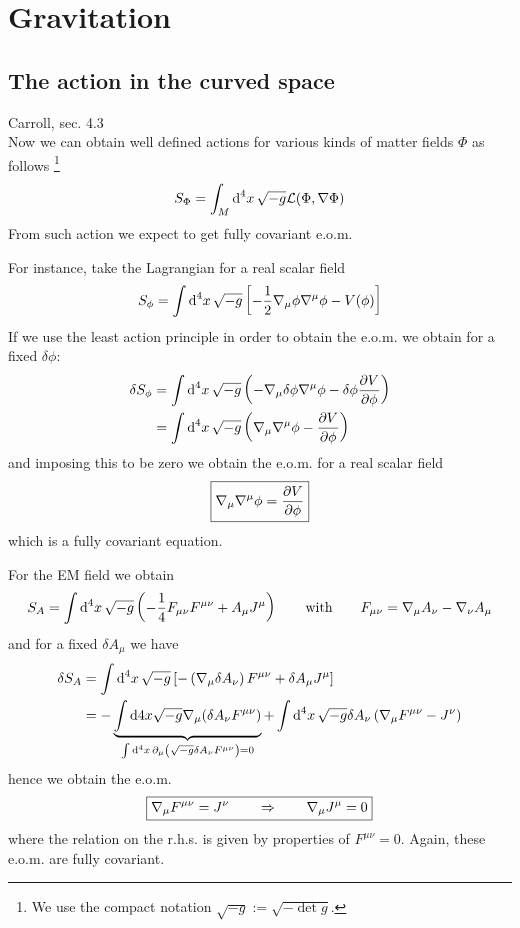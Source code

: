 \documentclass[../main/main.tex]{subfiles}
\begin{document}
\chapter{Gravitation}

\section{The action in the curved space}

\textsf{Carroll, sec. 4.3}\\

Now we can obtain well defined actions for various kinds of matter fields $\Phi$ as follows \footnote{We use the compact notation $\sqrt{-g}:=\sqrt{-\det g}$.}
\[S_\Phi=\int_M\textup{d}^{4}{x}\,\sqrt{-g}\mathcal L(\Phi,\nabla\Phi)\]
From such action we expect to get fully covariant e.o.m. 

For instance, take the Lagrangian for a real scalar field
\[S_\phi=\int\textup{d}^{4}{x}\,\sqrt{-g}\left[-\frac12\nabla_{\mu}\phi\nabla^\mu\phi-V(\phi)\right]\]
If we use the least action principle in order to obtain the e.o.m. we obtain for a fixed $\delta\phi$:
\begin{align*}
\delta S_\phi
&=\int\textup{d}^{4}{x}\,\sqrt{-g}\left(-\nabla_{\mu}\delta\phi\nabla^\mu\phi-\delta\phi\frac{\partial V}{\partial \phi}\right)\\
&=\int\textup{d}^{4}{x}\,\sqrt{-g}\left(\nabla_{\mu}\nabla^\mu\phi-\frac{\partial V}{\partial \phi}\right)
\end{align*}
and imposing this to be zero we obtain the e.o.m. for a real scalar field
\begin{equation}\boxed{
\nabla_\mu\nabla^\mu\phi=\frac{\partial V}{\partial \phi}
}\end{equation}
which is a fully covariant equation. 

For the EM field we obtain
\[S_A=\int\textup{d}^{4}{x}\,\sqrt{-g}\left(-\frac14F_{\mu\nu}F^{\mu\nu}+A_\mu J^\mu\right)\qquad\text{with}\qquad F_{\mu\nu}=\nabla_{\mu} A_\nu-\nabla_{\nu} A_\mu\]
and for a fixed $\delta A_\mu$ we have
\begin{align*}
\delta S_A&=\int\textup{d}^{4}{x}\,\sqrt{-g}\left[-\left(\nabla_{\mu}\delta A_\nu\right)F^{\mu\nu}+\delta A_\mu J^\mu\right]\\
&=-\underbrace{\int\textup{d}4x\sqrt{-g}\nabla_{\mu}(\delta A_\nu F^{\mu\nu})}_{\int\textup{d}^{4}{x}\,\partial_{\mu}\left(\sqrt{-g}\delta A_\nu F^{\mu\nu}\right)=0}+\int\textup{d}^{4}{x}\,\sqrt{-g}\delta A_\nu\left(\nabla_{\mu} F^{\mu\nu}-J^\nu\right)
\end{align*}
hence we obtain the e.o.m.
\begin{equation}\boxed{
\nabla_{\mu} F^{\mu\nu}=J^\nu\qquad\Rightarrow\qquad\nabla_{\mu} J^\mu=0
}\end{equation}
where the relation on the r.h.s. is given by properties of $F^{\mu\nu}=0$. Again, these e.o.m. are fully covariant. 
\end{document}
